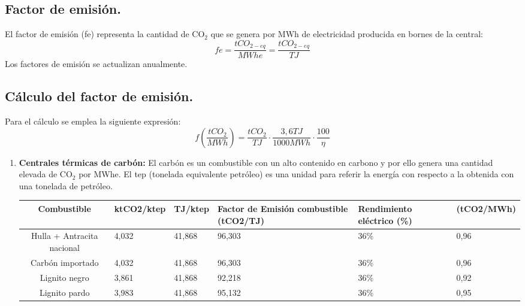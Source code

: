 \subsection{Factor de emisión.}
El factor de emisión (fe) representa la cantidad de CO$_2$ que se genera por MWh de electricidad producida en bornes de la central:
\[fe=\frac{tCO_{2-eq}}{MWhe}=\frac{tCO_{2-eq}}{TJ}\]
Los factores de emisión se actualizan anualmente.
\subsection{Cálculo del factor de emisión.}
Para el cálculo se emplea la siguiente expresión:
\[f\left(\frac{tCO_2}{MWh}\right)=\frac{tCO_2}{TJ}\cdot\frac{3,6 TJ}{1000 MWh}\cdot\frac{100}{\eta}\]
\begin{enumerate}
	\item \textbf{Centrales térmicas de carbón:}
		El carbón es un combustible con un alto contenido en carbono y por ello genera una cantidad elevada de CO$_2$ por MWhe. El tep (tonelada equivalente petróleo) es una unidad para referir la energía con respecto a la obtenida con una tonelada de petróleo.
	\begin{table}[H]
		\centering
		\renewcommand{\arraystretch}{1.1}
		\begin{tabular}{cm{2cm}m{2cm}m{3cm}m{2cm}m{2cm}}
			\hline
			\textbf{Combustible} & \textbf{ktCO2/ktep} & \textbf{TJ/ktep} & \textbf{Factor de Emisión  combustible (tCO2/TJ)} & \textbf{Rendimiento eléctrico (\%)} & (tCO2/MWh)\\  
			\hline
			Hulla + Antracita nacional & 4,032 & 41,868 & 96,303 & 36\% & 0,96 \\
			Carbón importado           & 4,032 & 41,868 & 96,303 & 36\% & 0,96 \\
			Lignito negro              & 3,861 & 41,868 & 92,218 & 36\% & 0,92 \\
			Lignito pardo              & 3,983 & 41,868 & 95,132 & 36\% &0,95 \\ \hline
		\end{tabular}
	\end{table}
	

\end{enumerate}
